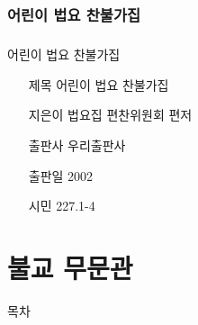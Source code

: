 \documentclass[aspectratio=1610,17pt,xcolor=pdftex,dvipsnames,table,handout]{beamer}
\begin{document}
		\section{ 어린이 법요 찬불가집 }
		\begin{frame} [t,plain]
		\frametitle{}
			\begin{block} { 어린이 법요 찬불가집 }
			\setlength{\leftmargini}{4em}			
			\begin{itemize}
				\item [제목]  	어린이 법요 찬불가집 
				\item [지은이]	법요집 편찬위원회 편저
				\item [출판사]	우리출판사
				\item [출판일]	2002
				\item [시민]		227.1-4	
			\end{itemize}
			\end{block}						
		\end{frame}						

		\begin{frame} [t,plain]
		\end{frame}			
		\begin{frame} [t,plain]
		\end{frame}			
		\begin{frame} [t,plain]
		\end{frame}			

		\part{ 불교 무문관 }											%
		\frame{\partpage}

		\begin{frame} [plain]{목차}
		\tableofcontents%
		\end{frame}


\end{document}
